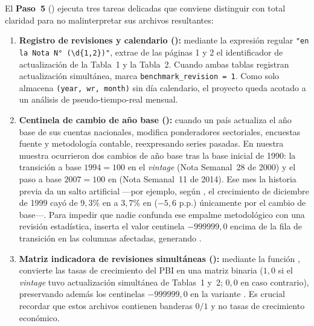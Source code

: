 \documentclass[12pt,letterpaper]{article}
\begin{document}
El \textbf{Paso~5} () ejecuta tres tareas delicadas que conviene distinguir con total claridad para no malinterpretar sus archivos resultantes:
\begin{enumerate}
  \item \textbf{Registro de revisiones y calendario ():} mediante la expresión regular \texttt{"en la Nota N° (\textbackslash d\{1,2\})"}, extrae de las páginas 1 y 2 el identificador de actualización de la Tabla~1 y la Tabla~2. Cuando ambas tablas registran actualización simultánea, marca \texttt{benchmark\_revision = 1}. Como  solo almacena \texttt{(year, wr, month)} sin día calendario, el proyecto queda acotado a un análisis de pseudo-tiempo-real mensual.
  \item \textbf{Centinela de cambio de año base ():} cuando un país actualiza el año base de sus cuentas nacionales, modifica ponderadores sectoriales, encuestas fuente y metodología contable, reexpresando series pasadas. En nuestra muestra ocurrieron dos cambios de año base tras la base inicial de 1990: la transición a base \(1994 = 100\) en el \emph{vintage}  (Nota Semanal~28 de 2000) y el paso a base \(2007 = 100\) en  (Nota Semanal~11 de 2014). Ese mes la historia previa da un salto artificial —por ejemplo, según , el crecimiento de diciembre de 1999 cayó de \(9{,}3\%\) en  a \(3{,}7\%\) en  (\(-5{,}6\) p.p.) únicamente por el cambio de base—. Para impedir que nadie confunda ese empalme metodológico con una revisión estadística,  inserta el valor centinela \(-999999{,}0\) encima de la fila de transición en las columnas afectadas, generando .
  \item \textbf{Matriz indicadora de revisiones simultáneas ():} mediante la función , convierte las tasas de crecimiento del PBI en una matriz binaria (\(1{,}0\) si el \emph{vintage} tuvo actualización simultánea de Tablas~1 y~2; \(0{,}0\) en caso contrario), preservando además los centinelas \(-999999{,}0\) en la variante . Es crucial recordar que estos archivos  contienen banderas \(0/1\) y no tasas de crecimiento económico.
\end{enumerate}
\end{document}
